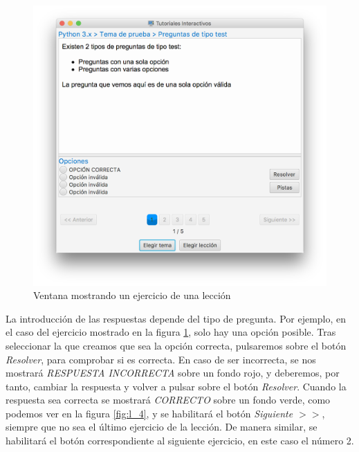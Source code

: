 \documentclass[]{article}
\begin{document}
%
\begin{figure}[tbp]
\begin{center}
\includegraphics[scale=0.35]{l_3.png}
\end{center}
\caption{Ventana mostrando un ejercicio de una lección\label{fig:l_3}}
\end{figure}
%


La introducción de las respuestas depende del tipo de pregunta. Por ejemplo, en el caso del ejercicio mostrado en la figura \ref{fig:l_3}, solo hay una opción posible. Tras seleccionar la que creamos que sea la opción correcta, pulsaremos sobre el botón \emph{Resolver}, para comprobar si es correcta. En caso de ser incorrecta, se nos mostrará \emph{RESPUESTA INCORRECTA} sobre un fondo rojo, y deberemos, por tanto, cambiar la respuesta y volver a pulsar sobre el botón \emph{Resolver}. Cuando la respuesta sea correcta se mostrará \emph{CORRECTO} sobre un fondo verde,  como podemos ver en la figura \ref{fig:l_4}, y se habilitará el botón \emph{Siguiente $>>$}, siempre que no sea el último ejercicio de la lección. De manera similar, se habilitará el botón correspondiente al siguiente ejercicio, en este caso el número 2. 
\end{document}
